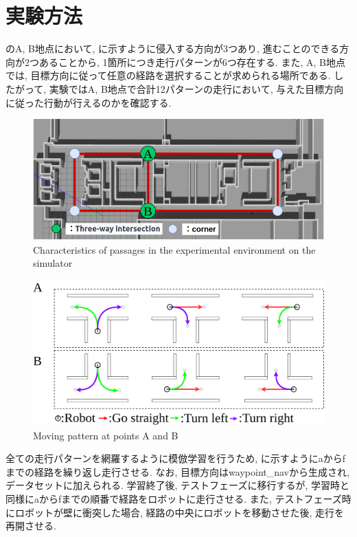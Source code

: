 
  \section{実験方法}
  のA, B地点において, に示すように侵入する方向が3つあり, 進むことのできる方向が2つあることから, 1箇所につき走行パターンが6つ存在する. 
また, A, B地点では, 目標方向に従って任意の経路を選択することが求められる場所である.
したがって, 実験ではA, B地点で合計12パターンの走行において, 与えた目標方向に従った行動が行えるのかを確認する.

\begin{figure}[hbtp]
  \centering
 \includegraphics[keepaspectratio, scale=0.5]
      {images/sim_explain.png}
 \caption{Characteristics of passages in the experimental environment on the simulator}
 \label{Fig:sim_explain}
\end{figure}

\begin{figure}[hbtp]
  \centering
 \includegraphics[keepaspectratio, scale=0.15]
      {images/select.png}
 \caption{Moving pattern at points A and B}
 \label{Fig:select}
\end{figure}

全ての走行パターンを網羅するように模倣学習を行うため, に示すようにaからfまでの経路を繰り返し走行させる. なお, 目標方向はwaypoint\_navから生成され, データセットに加えられる. 学習終了後, テストフェーズに移行するが, 学習時と同様にaからfまでの順番で経路をロボットに走行させる. また, テストフェーズ時にロボットが壁に衝突した場合, 経路の中央にロボットを移動させた後, 走行を再開させる.

